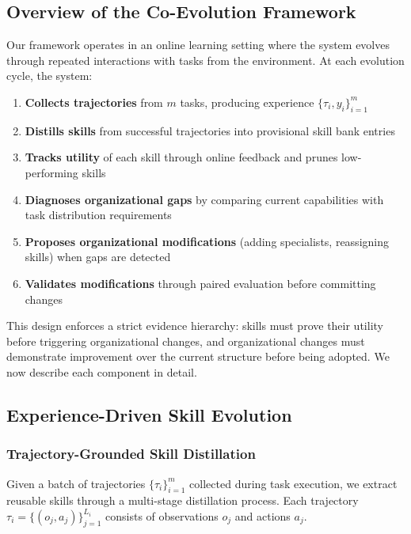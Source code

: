 \subsection{Overview of the Co-Evolution Framework}

Our framework operates in an online learning setting where the system evolves through repeated interactions with tasks from the environment. At each evolution cycle, the system:

\begin{enumerate}
    \item \textbf{Collects trajectories} from $m$ tasks, producing experience $\{\tau_i, y_i\}_{i=1}^{m}$
    \item \textbf{Distills skills} from successful trajectories into provisional skill bank entries
    \item \textbf{Tracks utility} of each skill through online feedback and prunes low-performing skills
    \item \textbf{Diagnoses organizational gaps} by comparing current capabilities with task distribution requirements
    \item \textbf{Proposes organizational modifications} (adding specialists, reassigning skills) when gaps are detected
    \item \textbf{Validates modifications} through paired evaluation before committing changes
\end{enumerate}

This design enforces a strict evidence hierarchy: skills must prove their utility before triggering organizational changes, and organizational changes must demonstrate improvement over the current structure before being adopted. We now describe each component in detail.


\subsection{Experience-Driven Skill Evolution}

\subsubsection{Trajectory-Grounded Skill Distillation}

Given a batch of trajectories $\{\tau_i\}_{i=1}^{m}$ collected during task execution, we extract reusable skills through a multi-stage distillation process. Each trajectory $\tau_i = \{(o_j, a_j)\}_{j=1}^{L_i}$ consists of observations $o_j$ and actions $a_j$.

